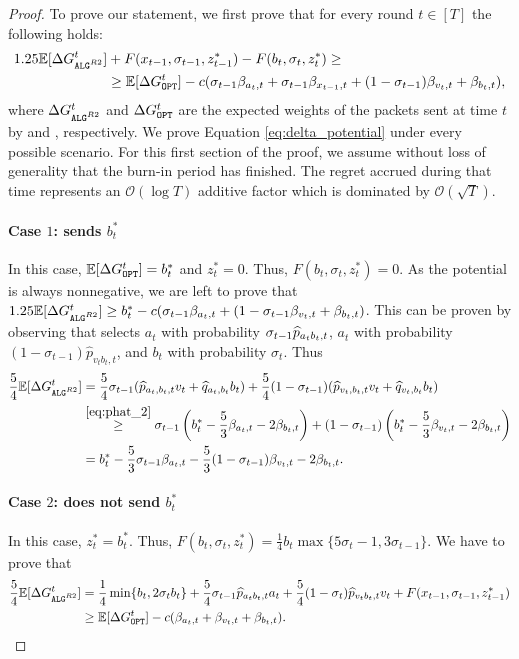 \begin{proof}
    To prove our statement, we first prove that for every round $t \in [T]$ the following holds:
    \begin{align}
    \label{eq:delta_potential}
        1.25\mathbb{E}[\Delta \Galgrtwo^t] &+ F(x_{t-1}, \sigma_{t-1}, z_{t-1}^*)-F(b_{t}, \sigma_{t}, z_{t}^*) \ge \notag \\
        &\ge \mathbb{E}[\Delta \Gopt^t]-c(\sigma_{t-1}\beta_{a_t, t}+\sigma_{t-1}\beta_{x_{t-1}, t}+(1-\sigma_{t-1})\beta_{v_t, t}+\beta_{b_t, t}),
    \end{align}
    where $\Delta \Galgrtwo^t$ and $\Delta \Gopt^t$ are the expected weights of the packets sent at time $t$ by \algrtwo and \opt, respectively. We prove Equation \eqref{eq:delta_potential} under every possible scenario. For this first section of the proof, we assume without loss of generality that the burn-in period has finished. The regret accrued during that time represents an $\mathcal{O}\left(\log T\right)$ additive factor which is dominated by $\mathcal{O}(\sqrt{T})$.
    \paragraph{Case $1$: \opt sends $b_t^*$}
    In this case, $\mathbb{E}[\Delta \Gopt^t] = b_t^*$ and $z_t^*=0$. Thus, $F(b_{t}, \sigma_{t}, z_{t}^*)=0$. As the potential is always nonnegative, we are left to prove that $1.25\mathbb{E}[\Delta \Galgrtwo^t] \ge b_t^* - c(\sigma_{t-1}\beta_{a_t,t}+(1-\sigma_{t-1}\beta_{v_t, t}+\beta_{b_t,t})$. This can be proven by observing that \algrtwo selects $a_t$ with probability $\sigma_{t-1}\widehat{p}_{a_t b_t, t}$, $a_t$ with probability $(1-\sigma_{t-1})\widehat{p}_{v_t b_t,t}$, and $b_t$ with probability $\sigma_t$. Thus
    \begin{align*}
        \frac{5}{4}\mathbb{E}[\Delta \Galgrtwo^t] &= \frac{5}{4}\sigma_{t-1}(\widehat{p}_{a_t, b_t,t}v_t + \widehat{q}_{a_t, b_t}b_t)+ \frac{5}{4}(1-\sigma_{t-1})(\widehat{p}_{v_t, b_t,t}v_t + \widehat{q}_{v_t, b_t}b_t) \\
        &\stackrel{\eqref{eq:phat_2}}{\ge} \sigma_{t-1}\left(b_t^*-\frac{5}{3}\beta_{a_t,t}-2\beta_{b_t,t}\right)+ (1-\sigma_{t-1})\left(b_t^*-\frac{5}{3}\beta_{v_t,t}-2\beta_{b_t,t}\right) \\
        &= b_t^* - \frac{5}{3}\sigma_{t-1}\beta_{a_t,t}- \frac{5}{3}(1-\sigma_{t-1})\beta_{v_t,t}-2\beta_{b_t,t}.
    \end{align*}
    \paragraph{Case $2$: \opt does not send $b_t^*$}
    In this case, $z_t^*=b_t^*$. Thus, $F(b_{t}, \sigma_{t}, z_{t}^*)=\frac{1}{4}b_{t}\max\{5\sigma_{t}-1, 3\sigma_{t-1}\}$. We have to prove that
    \begin{align*}
        \frac{5}{4}\mathbb{E}[\Delta \Galgrtwo^t]&=\frac{1}{4}\min\{b_t, 2\sigma_t b_t\}+\frac{5}{4}\sigma_{t-1}\phat a_t+\frac{5}{4}(1-\sigma_t)\widehat{p}_{v_t b_t,t} v_t+ F(x_{t-1}, \sigma_{t-1}, z_{t-1}^*) \\
        &\ge \mathbb{E}[\Delta \Gopt^t]-c(\beta_{a_t, t}+\beta_{v_t, t}+\beta_{b_t, t}).
    \end{align*}

\end{proof}
